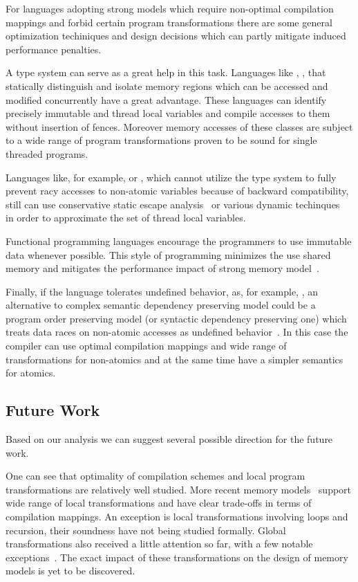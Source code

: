 For languages adopting strong models which require non-optimal
compilation mappings and forbid certain program transformations
there are some general optimization techiniques and design decisions
which can partly mitigate induced performance penalties.

A type system can serve as a great help in this task. 
Languages like \Haskell, \OCaml, \Rust that 
statically distinguish and isolate memory regions 
which can be accessed and modified concurrently have a great advantage.
These languages can identify precisely 
immutable and thread local variables
and compile accesses to them without insertion of fences.
Moreover memory accesses of these classes are subject to 
a wide range of program transformations proven to be
sound for single threaded programs. 
 
Languages like, for example, \Java or \Kotlin, which cannot utilize the type system 
to fully prevent racy accesses to non-atomic variables 
because of backward compatibility, still can 
use conservative static escape analysis~\cite{Choi-al:OOPSLA1999}
or various dynamic techinques~\cite{Liu-al:PLDI19} 
in order to approximate the set of thread local variables.   

Functional programming languages encourage 
the programmers to use immutable data whenever possible.
This style of programming minimizes the use 
shared memory and mitigates the performance impact 
of strong memory model~\cite{Vollmer-al:PPoPP17}. 

Finally, if the language tolerates undefined behavior, as, for example, \CPP, 
an alternative to complex semantic dependency preserving model
could be a program order preserving model (or syntactic dependency preserving one) 
which treats data races on non-atomic accesses as 
undefined behavior~\cite{Boehm-Demsky:MSPC14, Ou-Demsky:OOPSLA18}.
In this case the compiler can use optimal compilation mappings 
and wide range of transformations for non-atomics 
and at the same time have a simpler semantics for atomics. 

\subsection{Future Work}

Based on our analysis we can suggest several
possible direction for the future work. 

One can see that optimality of compilation schemes 
and local program transformations are relatively well studied.
More recent memory models~%
\cite{Lahav-al:PLDI17, Dolan-al:PLDI18, Kang-al:POPL17, Chakraborty-Vafeiadis:POPL19} 
support wide range of local transformations and have clear 
trade-offs in terms of compilation mappings. 
An exception is local transformations involving loops and recursion, 
their soundness have not being studied formally. 
Global transformations also received a little attention so far,
with a few notable exceptions~\cite{PichonPharabod-Sewell:POPL16, Lee-al:PLDI20}.
The exact impact of these transformations on the design of 
memory models is yet to be discovered. 

